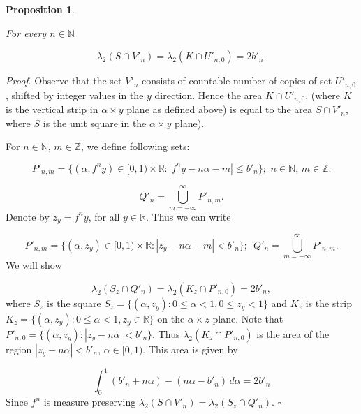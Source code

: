 \documentclass[11pt, english, reqno]{amsart}
\newtheorem{proposition}[theorem]{Proposition}
\theoremstyle{definition}
\theoremstyle{remark}
\numberwithin{equation}{section}
\numberwithin{equation}{section}
\begin{document}
\begin{proposition}\label{area}

For every $n \in \mathbb{N}$ 

\begin{equation*}
\lambda_2(S \cap V'_{n}) = \lambda_2 (K \cap U'_{n,0}) = 2 b'_n.
\end{equation*}

\end{proposition}

\noindent\textit{Proof}. Observe that the set $V'_{n}$ consists of countable number of copies of set $U'_{n,0}$, shifted by integer values in the $y$ direction. Hence the area $K \cap U'_{n,0}$, (where $K$ is the vertical strip in $\alpha \times y$ plane as defined above) is equal to the area $S \cap V'_{n}$, where $S$ is the unit square in the $\alpha \times y$ plane). 

For $n \in \mathbb{N}$, $m \in \mathbb{Z}$, we define following sets: 

\begin{equation}
    P'_{n,m} = \{(\alpha,f^n y) \in [0,1) \times \mathbb{R} : |f^n y -n\alpha - m| \leq b'_n\} ;\,\, n\in \mathbb{N}, \, m \in \mathbb{Z}.
\end{equation}

\begin{equation}
    Q'_n = \underset{m=-\infty}{\overset{\infty}{\bigcup}} P'_{n,m}. 
\end{equation} Denote by $z_y = f^n y$, for all $y \in \mathbb{R}$. Thus we can write
 
 \begin{equation}\label{eq defP}
P'_{n,m} = \{(\alpha,z_y) \in [0,1) \times \mathbb{R} : |z_y -n\alpha - m| < b'_n\}; \,\,\, Q'_n = \underset{m=-\infty}{\overset{\infty}{\bigcup}} P'_{n,m}.
 \end{equation} We will show 
 

\begin{equation}
\lambda_2(S_z \cap Q'_{n}) = \lambda_2 (K_z \cap P'_{n,0}) = 2 b'_n,
\end{equation} where $S_z$ is the square $S_z = \{(\alpha,z_y) : 0\leq \alpha <1,0\leq z_y < 1\}$ and $K_z$ is the strip $K_z = \{(\alpha,z_y) :0\leq \alpha < 1, z_y \in \mathbb{R}\}$ on the $\alpha \times z$ plane. Note that $P'_{n,0} = \{(\alpha,z_y) : |z_y -n\alpha| < b'_n\}$.  Thus $\lambda_2 (K_z \cap P'_{n,0})$ is the area of the region $|z_y -n\alpha| < b'_n$, $\alpha \in [0,1)$. This area is given by 

$$
\int_{0}^{1} (b'_n + n \alpha) - (n \alpha -b'_n) \, d \alpha = 2b'_n
$$ Since $f^n$ is measure preserving $\lambda_2(S \cap V'_{n}) = \lambda_2(S_z \cap Q'_{n})$. \hfill{$\square$}
\end{document}
